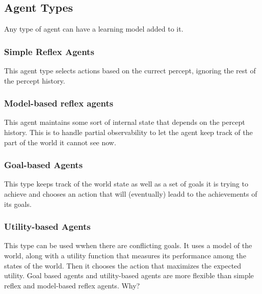 \documentclass[12pt]{article}
\begin{document}
\subsection{Agent Types}

Any type of agent can have a learning model added to it.

\subsubsection{Simple Reflex Agents}

This agent type selects actions based on the currect percept, ignoring the rest of the percept history.

\subsubsection{Model-based reflex agents}

This agent maintains some sort of internal state that depends on the percept history.
This is to handle partial observability to let the agent keep track of the part of the world it cannot see now.

\subsubsection{Goal-based Agents}

This type keeps track of the world state as well as a set of goals it is trying to achieve and chooses an action that will (eventually) leadd to the achievements of its goals.

\subsubsection{Utility-based Agents}

This type can be used wwhen there are conflicting goals. It uses a model of the world, along with a utility function that measures its performance among the states of the world.
Then it chooses the action that maximizes the expected utility.
Goal based agents and utility-based agents are more flexible than simple reflex and model-based reflex agents.
Why?
\end{document}

